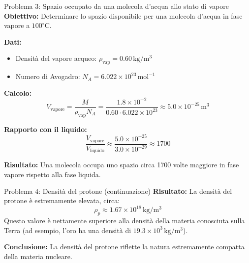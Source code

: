 \documentclass[9pt]{beamer}
\begin{document}
\begin{frame}{Problema 3: Spazio occupato da una molecola d'acqua allo stato di vapore}
    \textbf{Obiettivo:} Determinare lo spazio disponibile per una molecola d'acqua in fase vapore a $100^\circ \mathrm{C}$.
    
    \textbf{Dati:}
    \begin{itemize}
        \item Densità del vapore acqueo: $\rho_{\text{vap}} = 0.60 \, \mathrm{kg/m^3}$
        \item Numero di Avogadro: $N_A = 6.022 \times 10^{23} \, \mathrm{mol^{-1}}$
    \end{itemize}
    
    \textbf{Calcolo:}
    \[
    V_{\text{vapore}} = \frac{M}{\rho_{\text{vap}} N_A} = \frac{1.8 \times 10^{-2}}{0.60 \cdot 6.022 \times 10^{23}} \approx 5.0 \times 10^{-25} \, \mathrm{m^3}
    \]
    
    \textbf{Rapporto con il liquido:}
    \[
    \frac{V_{\text{vapore}}}{V_{\text{liquido}}} \approx \frac{5.0 \times 10^{-25}}{3.0 \times 10^{-29}} \approx 1700
    \]
    
    \textbf{Risultato:} Una molecola occupa uno spazio circa 1700 volte maggiore in fase vapore rispetto alla fase liquida.
\end{frame}

\begin{frame}{Problema 4: Densità del protone (continuazione)}
    \textbf{Risultato:} La densità del protone è estremamente elevata, circa:
    \[
    \rho_p \approx 1.67 \times 10^{18} \, \mathrm{kg/m^3}
    \]
    Questo valore è nettamente superiore alla densità della materia conosciuta sulla Terra (ad esempio, l'oro ha una densità di $19.3 \times 10^{3} \, \mathrm{kg/m^3}$).

    \textbf{Conclusione:} La densità del protone riflette la natura estremamente compatta della materia nucleare.
\end{frame}

\end{document}
